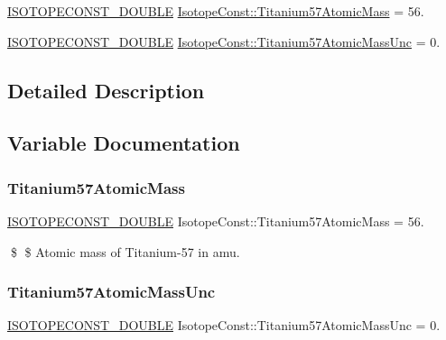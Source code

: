 \begin{DoxyCompactItemize}
\item 
\mbox{\hyperlink{group___isotope_const-_macros_ga8f45a7272ce02c0b4c65c44636ed719a}{I\+S\+O\+T\+O\+P\+E\+C\+O\+N\+S\+T\+\_\+\+D\+O\+U\+B\+LE}} \mbox{\hyperlink{group___isotope_const-_titanium-_ti57_ga155c6590c6ff6c0e71cdd0205dccab20}{Isotope\+Const\+::\+Titanium57\+Atomic\+Mass}} = 56.
\item 
\mbox{\hyperlink{group___isotope_const-_macros_ga8f45a7272ce02c0b4c65c44636ed719a}{I\+S\+O\+T\+O\+P\+E\+C\+O\+N\+S\+T\+\_\+\+D\+O\+U\+B\+LE}} \mbox{\hyperlink{group___isotope_const-_titanium-_ti57_gac57b229c2f111ee556ec03f3168051d6}{Isotope\+Const\+::\+Titanium57\+Atomic\+Mass\+Unc}} = 0.
\end{DoxyCompactItemize}


\subsection{Detailed Description}


\subsection{Variable Documentation}
\mbox{\label{group___isotope_const-_titanium-_ti57_ga155c6590c6ff6c0e71cdd0205dccab20}} 
\subsubsection{\texorpdfstring{Titanium57\+Atomic\+Mass}{Titanium57AtomicMass}}
{\footnotesize\ttfamily \mbox{\hyperlink{group___isotope_const-_macros_ga8f45a7272ce02c0b4c65c44636ed719a}{I\+S\+O\+T\+O\+P\+E\+C\+O\+N\+S\+T\+\_\+\+D\+O\+U\+B\+LE}} Isotope\+Const\+::\+Titanium57\+Atomic\+Mass = 56.}

\$ \$ Atomic mass of Titanium-\/57 in amu. \mbox{\label{group___isotope_const-_titanium-_ti57_gac57b229c2f111ee556ec03f3168051d6}} 
\subsubsection{\texorpdfstring{Titanium57\+Atomic\+Mass\+Unc}{Titanium57AtomicMassUnc}}
{\footnotesize\ttfamily \mbox{\hyperlink{group___isotope_const-_macros_ga8f45a7272ce02c0b4c65c44636ed719a}{I\+S\+O\+T\+O\+P\+E\+C\+O\+N\+S\+T\+\_\+\+D\+O\+U\+B\+LE}} Isotope\+Const\+::\+Titanium57\+Atomic\+Mass\+Unc = 0.}

